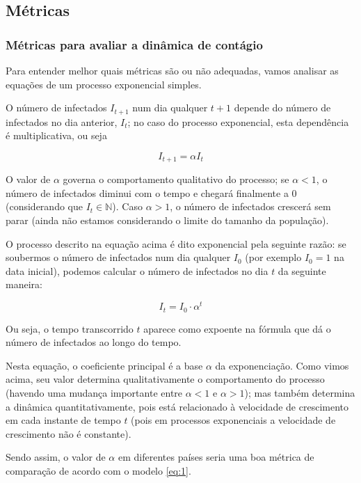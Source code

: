 \documentclass[12pt]{extarticle}
\begin{document}
\subsection{Métricas}

\subsubsection{Métricas para avaliar a dinâmica de contágio}

Para entender melhor quais métricas são ou não adequadas, vamos analisar as equações de um processo exponencial simples.

O número de infectados $I_{t+1}$ num dia qualquer $t+1$ depende do número de infectados no dia anterior, $I_t$; no caso do processo exponencial, esta dependência é multiplicativa, ou seja 

\begin{equation}
I_{t+1} = \alpha I_t
\end{equation}

O valor de $\alpha$ governa o comportamento qualitativo do processo; se $\alpha < 1$, o número de infectados diminui com o tempo e chegará finalmente a $0$ (considerando que $I_t \in \mathbb{N}$). Caso $\alpha > 1$, o número de infectados crescerá sem parar (ainda não estamos considerando o limite do tamanho da população).

O processo descrito na equação acima é dito exponencial pela seguinte razão: se soubermos o número de infectados num dia qualquer $I_0$ (por exemplo $I_0 = 1$ na data inicial), podemos calcular o número de infectados no dia $t$ da seguinte maneira:

\begin{equation}\label{eq:1}
I_t = I_0 \cdot \alpha ^{t}
\end{equation}

Ou seja, o tempo transcorrido $t$ aparece como expoente na fórmula que dá o número de infectados ao longo do tempo.

Nesta equação, o coeficiente principal é a base $\alpha$ da exponenciação. Como vimos acima, seu valor determina qualitativamente o comportamento do processo (havendo uma mudança importante entre $\alpha < 1$ e $\alpha > 1$); mas também determina a dinâmica quantitativamente, pois está relacionado à velocidade de crescimento em cada instante de tempo $t$ (pois em processos exponenciais a velocidade de crescimento não é constante).

Sendo assim, o valor de $\alpha$ em diferentes países seria uma boa métrica de comparação de acordo com o modelo \ref{eq:1}. 
\end{document}
